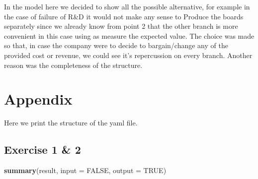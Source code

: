 \documentclass[]{article}
\newenvironment{Shaded}{\begin{snugshade}}{\end{snugshade}}
\newcommand{\KeywordTok}[1]{\textcolor[rgb]{0.13,0.29,0.53}{\textbf{#1}}}
\newcommand{\DataTypeTok}[1]{\textcolor[rgb]{0.13,0.29,0.53}{#1}}
\newcommand{\OtherTok}[1]{\textcolor[rgb]{0.56,0.35,0.01}{#1}}
\newcommand{\NormalTok}[1]{#1}
\begin{document}
In the model here we decided to show all the possible alternative, for
example in the case of failure of R\&D it would not make any sense to
Produce the boards separately since we already know from point 2 that
the other branch is more convenient in this case using as measure the
expected value. The choice was made so that, in case the company were to
decide to bargain/change any of the provided cost or revenue, we could
see it's repercussion on every branch. Another reason was the
completeness of the structure.

\pagebreak

\section{Appendix}\label{appendix}

Here we print the structure of the yaml file.

\subsection{Exercise 1 \& 2}\label{exercise-1-2}

\begin{Shaded}
\begin{Highlighting}[]
\KeywordTok{summary}\NormalTok{(result, }\DataTypeTok{input =} \OtherTok{FALSE}\NormalTok{, }\DataTypeTok{output =} \OtherTok{TRUE}\NormalTok{)}
\end{Highlighting}
\end{Shaded}
\end{document}
